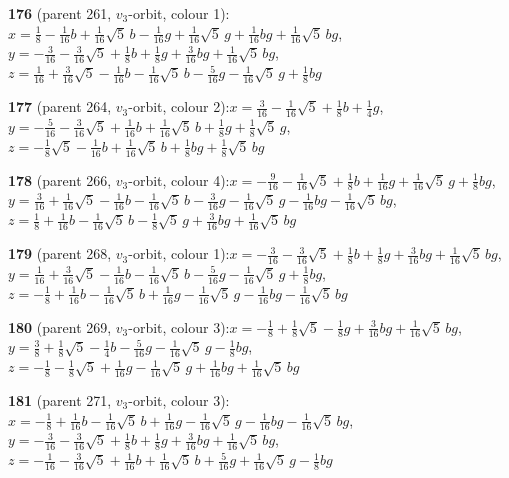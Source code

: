 \documentclass[10pt]{article}
\begin{document}
{\noindent\textbf{176} (parent 261, $v_3$-orbit, colour 1):\quad $x=\tfrac{1}{8}-\tfrac{1}{16}b+\tfrac{1}{16}\sqrt5\,b-\tfrac{1}{16}g+\tfrac{1}{16}\sqrt5\,g+\tfrac{1}{16}bg+\tfrac{1}{16}\sqrt5\,bg$,\quad $y=-\tfrac{3}{16}-\tfrac{3}{16}\sqrt5+\tfrac{1}{8}b+\tfrac{1}{8}g+\tfrac{3}{16}bg+\tfrac{1}{16}\sqrt5\,bg$,\quad $z=\tfrac{1}{16}+\tfrac{3}{16}\sqrt5-\tfrac{1}{16}b-\tfrac{1}{16}\sqrt5\,b-\tfrac{5}{16}g-\tfrac{1}{16}\sqrt5\,g+\tfrac{1}{8}bg$\par\smallskip
\noindent\textbf{177} (parent 264, $v_3$-orbit, colour 2):\quad $x=\tfrac{3}{16}-\tfrac{1}{16}\sqrt5+\tfrac{1}{8}b+\tfrac{1}{4}g$,\quad $y=-\tfrac{5}{16}-\tfrac{3}{16}\sqrt5+\tfrac{1}{16}b+\tfrac{1}{16}\sqrt5\,b+\tfrac{1}{8}g+\tfrac{1}{8}\sqrt5\,g$,\quad $z=-\tfrac{1}{8}\sqrt5-\tfrac{1}{16}b+\tfrac{1}{16}\sqrt5\,b+\tfrac{1}{8}bg+\tfrac{1}{8}\sqrt5\,bg$\par\smallskip
\noindent\textbf{178} (parent 266, $v_3$-orbit, colour 4):\quad $x=-\tfrac{9}{16}-\tfrac{1}{16}\sqrt5+\tfrac{1}{8}b+\tfrac{1}{16}g+\tfrac{1}{16}\sqrt5\,g+\tfrac{1}{8}bg$,\quad $y=\tfrac{3}{16}+\tfrac{1}{16}\sqrt5-\tfrac{1}{16}b-\tfrac{1}{16}\sqrt5\,b-\tfrac{3}{16}g-\tfrac{1}{16}\sqrt5\,g-\tfrac{1}{16}bg-\tfrac{1}{16}\sqrt5\,bg$,\quad $z=\tfrac{1}{8}+\tfrac{1}{16}b-\tfrac{1}{16}\sqrt5\,b-\tfrac{1}{8}\sqrt5\,g+\tfrac{3}{16}bg+\tfrac{1}{16}\sqrt5\,bg$\par\smallskip
\noindent\textbf{179} (parent 268, $v_3$-orbit, colour 1):\quad $x=-\tfrac{3}{16}-\tfrac{3}{16}\sqrt5+\tfrac{1}{8}b+\tfrac{1}{8}g+\tfrac{3}{16}bg+\tfrac{1}{16}\sqrt5\,bg$,\quad $y=\tfrac{1}{16}+\tfrac{3}{16}\sqrt5-\tfrac{1}{16}b-\tfrac{1}{16}\sqrt5\,b-\tfrac{5}{16}g-\tfrac{1}{16}\sqrt5\,g+\tfrac{1}{8}bg$,\quad $z=-\tfrac{1}{8}+\tfrac{1}{16}b-\tfrac{1}{16}\sqrt5\,b+\tfrac{1}{16}g-\tfrac{1}{16}\sqrt5\,g-\tfrac{1}{16}bg-\tfrac{1}{16}\sqrt5\,bg$\par\smallskip
\noindent\textbf{180} (parent 269, $v_3$-orbit, colour 3):\quad $x=-\tfrac{1}{8}+\tfrac{1}{8}\sqrt5-\tfrac{1}{8}g+\tfrac{3}{16}bg+\tfrac{1}{16}\sqrt5\,bg$,\quad $y=\tfrac{3}{8}+\tfrac{1}{8}\sqrt5-\tfrac{1}{4}b-\tfrac{5}{16}g-\tfrac{1}{16}\sqrt5\,g-\tfrac{1}{8}bg$,\quad $z=-\tfrac{1}{8}-\tfrac{1}{8}\sqrt5+\tfrac{1}{16}g-\tfrac{1}{16}\sqrt5\,g+\tfrac{1}{16}bg+\tfrac{1}{16}\sqrt5\,bg$\par\smallskip
\noindent\textbf{181} (parent 271, $v_3$-orbit, colour 3):\quad $x=-\tfrac{1}{8}+\tfrac{1}{16}b-\tfrac{1}{16}\sqrt5\,b+\tfrac{1}{16}g-\tfrac{1}{16}\sqrt5\,g-\tfrac{1}{16}bg-\tfrac{1}{16}\sqrt5\,bg$,\quad $y=-\tfrac{3}{16}-\tfrac{3}{16}\sqrt5+\tfrac{1}{8}b+\tfrac{1}{8}g+\tfrac{3}{16}bg+\tfrac{1}{16}\sqrt5\,bg$,\quad $z=-\tfrac{1}{16}-\tfrac{3}{16}\sqrt5+\tfrac{1}{16}b+\tfrac{1}{16}\sqrt5\,b+\tfrac{5}{16}g+\tfrac{1}{16}\sqrt5\,g-\tfrac{1}{8}bg$\par\smallskip
}
\end{document}
